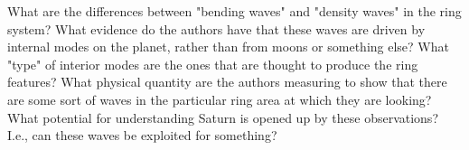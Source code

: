 \documentclass[12pt]{article}
\begin{document}
What are the differences between "bending waves" and "density waves" in the ring system?
What evidence do the authors have that these waves are driven by internal modes on the planet, rather than from moons or something else?
What "type" of interior modes are the ones that are thought to produce the ring features?
What physical quantity are the authors measuring to show that there are some sort of waves in the particular ring area at which they are looking?
What potential for understanding Saturn is opened up by these observations? I.e., can these waves be exploited for something?
\end{document}
